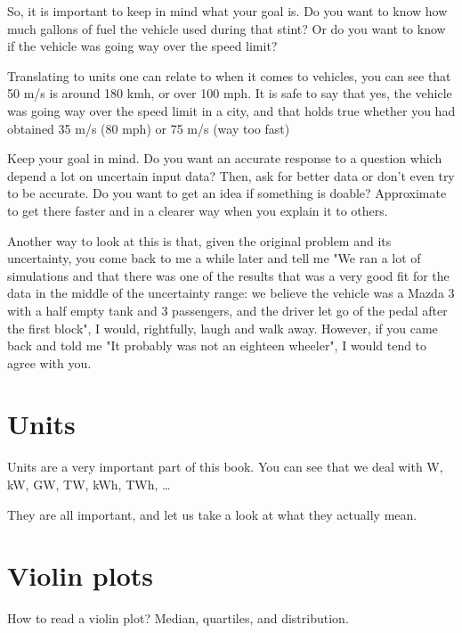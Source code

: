 So, it is important to keep in mind what your goal is. Do you want to know how much gallons of fuel the vehicle used during that stint? Or do you want to know if the vehicle was going way over the speed limit?

Translating to units one can relate to when it comes to vehicles, you can see that 50 m/s is around 180 kmh, or over 100 mph. It is safe to say that yes, the vehicle was going way over the speed limit in a city, and that holds true whether you had obtained 35 m/s (80 mph) or 75 m/s (way too fast)

\begin{kaobox}
Keep your goal in mind. Do you want an accurate response to a question which depend a lot on uncertain input data? Then, ask for better data or don't even try to be accurate. Do you want to get an idea if something is doable? Approximate to get there faster and in a clearer way when you explain it to others.
\end{kaobox}

Another way to look at this is that, given the original problem and its uncertainty, you come back to me a while later and tell me "We ran a lot of simulations and that there was one of the results that was a very good fit for the data in the middle of the uncertainty range: we believe the vehicle was a Mazda 3 with a half empty tank and 3 passengers, and the driver let go of the pedal after the first block", I would, rightfully, laugh and walk away. However, if you came back and told me "It probably was not an eighteen wheeler", I would tend to agree with you.                                                                  



\section{Units}

Units are a very important part of this book. You can see that we deal with W, kW, GW, TW, kWh, TWh, \ldots

They are all important, and let us take a look at what they actually mean.

\section{Violin plots}

How to read a violin plot? Median, quartiles, and distribution.

